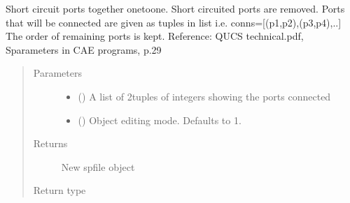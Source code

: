 \documentclass[letterpaper,10pt,english]{sphinxmanual}
\begin{document}
\begin{fulllineitems}
\begin{fulllineitems}
\begin{quote}
\begin{description}
\end{description}\end{quote}

\end{fulllineitems}


\begin{fulllineitems}
\label{\detokenize{touchstone:touchstone.spfile.connect_2_ports_list}}
Short circuit ports together one\sphinxhyphen{}to\sphinxhyphen{}one. Short circuited ports are removed.
Ports that will be connected are given as tuples in list 
i.e. conns={[}(p1,p2),(p3,p4),..{]}
The order of remaining ports is kept.
Reference: QUCS technical.pdf, S\sphinxhyphen{}parameters in CAE programs, p.29
\begin{quote}\begin{description}
\item[{Parameters}] \leavevmode\begin{itemize}
\item {} 
 () \textendash{} A list of 2\sphinxhyphen{}tuples of integers showing the ports connected

\item {} 
 (\sphinxstyleliteralemphasis{\sphinxupquote{, }}) \textendash{} Object editing mode. Defaults to \sphinxhyphen{}1.

\end{itemize}

\item[{Returns}] \leavevmode
New spfile object

\item[{Return type}] \leavevmode
{\hyperref[\detokenize{touchstone:touchstone.spfile}]{}}

\end{description}\end{quote}

\end{fulllineitems}


\end{fulllineitems}
\end{document}
